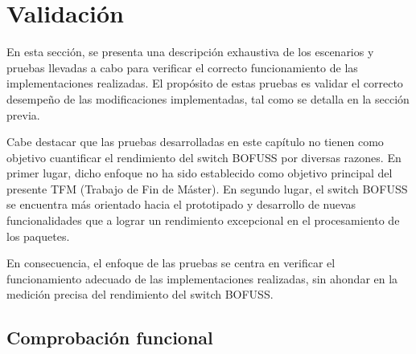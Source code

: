 \section{Validación}
\label{sec:vali}

En esta sección, se presenta una descripción exhaustiva de los escenarios y pruebas llevadas a cabo para verificar el correcto funcionamiento de las implementaciones realizadas. El propósito de estas pruebas es validar el correcto desempeño de las modificaciones implementadas, tal como se detalla en la sección previa.

Cabe destacar que las pruebas desarrolladas en este capítulo no tienen como objetivo cuantificar el rendimiento del switch BOFUSS por diversas razones. En primer lugar, dicho enfoque no ha sido establecido como objetivo principal del presente TFM (Trabajo de Fin de Máster). En segundo lugar, el switch BOFUSS se encuentra más orientado hacia el prototipado y desarrollo de nuevas funcionalidades que a lograr un rendimiento excepcional en el procesamiento de los paquetes.

En consecuencia, el enfoque de las pruebas se centra en verificar el funcionamiento adecuado de las implementaciones realizadas, sin ahondar en la medición precisa del rendimiento del switch BOFUSS.

\subsection{Comprobación funcional}


